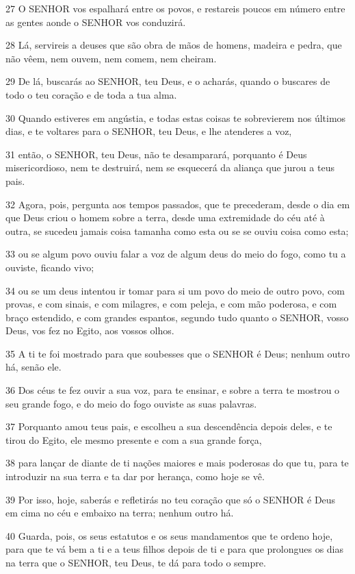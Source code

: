 \par 27 O SENHOR vos espalhará entre os povos, e restareis poucos em número entre as gentes aonde o SENHOR vos conduzirá.
\par 28 Lá, servireis a deuses que são obra de mãos de homens, madeira e pedra, que não vêem, nem ouvem, nem comem, nem cheiram.
\par 29 De lá, buscarás ao SENHOR, teu Deus, e o acharás, quando o buscares de todo o teu coração e de toda a tua alma.
\par 30 Quando estiveres em angústia, e todas estas coisas te sobrevierem nos últimos dias, e te voltares para o SENHOR, teu Deus, e lhe atenderes a voz,
\par 31 então, o SENHOR, teu Deus, não te desamparará, porquanto é Deus misericordioso, nem te destruirá, nem se esquecerá da aliança que jurou a teus pais.
\par 32 Agora, pois, pergunta aos tempos passados, que te precederam, desde o dia em que Deus criou o homem sobre a terra, desde uma extremidade do céu até à outra, se sucedeu jamais coisa tamanha como esta ou se se ouviu coisa como esta;
\par 33 ou se algum povo ouviu falar a voz de algum deus do meio do fogo, como tu a ouviste, ficando vivo;
\par 34 ou se um deus intentou ir tomar para si um povo do meio de outro povo, com provas, e com sinais, e com milagres, e com peleja, e com mão poderosa, e com braço estendido, e com grandes espantos, segundo tudo quanto o SENHOR, vosso Deus, vos fez no Egito, aos vossos olhos.
\par 35 A ti te foi mostrado para que soubesses que o SENHOR é Deus; nenhum outro há, senão ele.
\par 36 Dos céus te fez ouvir a sua voz, para te ensinar, e sobre a terra te mostrou o seu grande fogo, e do meio do fogo ouviste as suas palavras.
\par 37 Porquanto amou teus pais, e escolheu a sua descendência depois deles, e te tirou do Egito, ele mesmo presente e com a sua grande força,
\par 38 para lançar de diante de ti nações maiores e mais poderosas do que tu, para te introduzir na sua terra e ta dar por herança, como hoje se vê.
\par 39 Por isso, hoje, saberás e refletirás no teu coração que só o SENHOR é Deus em cima no céu e embaixo na terra; nenhum outro há.
\par 40 Guarda, pois, os seus estatutos e os seus mandamentos que te ordeno hoje, para que te vá bem a ti e a teus filhos depois de ti e para que prolongues os dias na terra que o SENHOR, teu Deus, te dá para todo o sempre.
